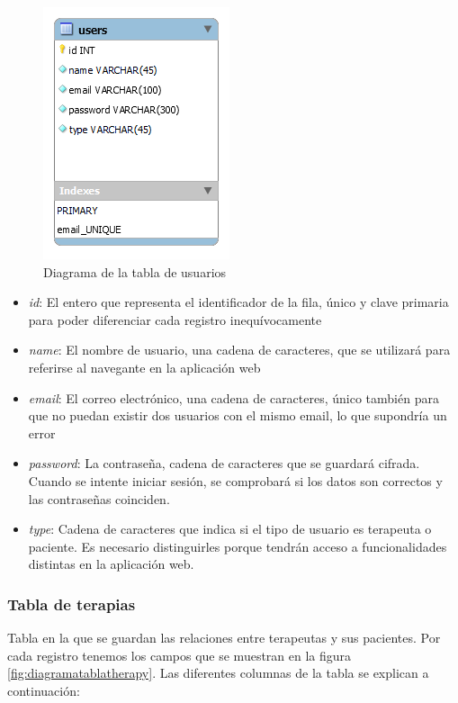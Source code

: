 \begin{figure}[h]
	\centering
	\includegraphics[scale=1.0]{Imagenes/Vectorial/diagrama_tabla_users}
	\caption{Diagrama de la tabla de usuarios}
	\label{fig:diagramatablausers}
\end{figure}

\begin{itemize}
	\item \textit{id}: El entero que representa el identificador de la fila, único y clave primaria para poder diferenciar cada registro inequívocamente
	\item \textit{name}: El nombre de usuario, una cadena de caracteres, que se utilizará para referirse al navegante en la aplicación web
	\item \textit{email}: El correo electrónico, una cadena de caracteres, único también para que no puedan existir dos usuarios con el mismo email, lo que supondría un error
	\item \textit{password}: La contraseña, cadena de caracteres que se guardará cifrada. Cuando se intente iniciar sesión, se comprobará si los datos son correctos y las contraseñas coinciden.
	\item \textit{type}: Cadena de caracteres que indica si el tipo de usuario es terapeuta o paciente. Es necesario distinguirles porque tendrán acceso a funcionalidades distintas en la aplicación web.
\end{itemize}

\subsubsection{Tabla de terapias}
Tabla en la que se guardan las relaciones entre terapeutas y sus pacientes. Por cada registro tenemos los campos que se muestran en la figura \ref{fig:diagramatablatherapy}. Las diferentes columnas de la tabla se explican a continuación:

